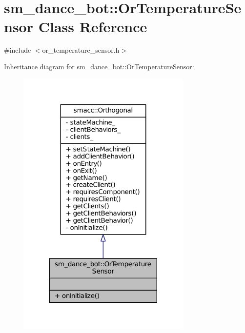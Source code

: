 \hypertarget{classsm__dance__bot_1_1OrTemperatureSensor}{}\section{sm\+\_\+dance\+\_\+bot\+:\+:Or\+Temperature\+Sensor Class Reference}
\label{classsm__dance__bot_1_1OrTemperatureSensor}


{\ttfamily \#include $<$or\+\_\+temperature\+\_\+sensor.\+h$>$}



Inheritance diagram for sm\+\_\+dance\+\_\+bot\+:\+:Or\+Temperature\+Sensor\+:
\nopagebreak
\begin{figure}[H]
\begin{center}
\leavevmode
\includegraphics[width=245pt]{classsm__dance__bot_1_1OrTemperatureSensor__inherit__graph}
\end{center}
\end{figure}


